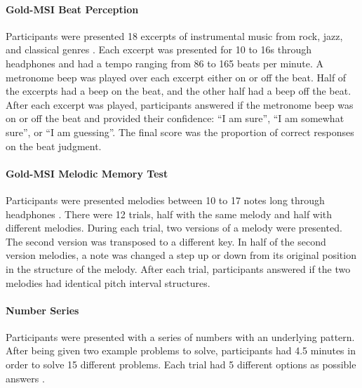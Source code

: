 \documentclass[12pt,]{book}
\let\oldparagraph\paragraph
\renewcommand{\paragraph}[1]{\oldparagraph{#1}\mbox{}}
\begin{document}
\hypertarget{gold-msi-beat-perception}{%
\paragraph{Gold-MSI Beat Perception}\label{gold-msi-beat-perception}}

Participants were presented 18 excerpts of instrumental music from rock, jazz, and classical genres \citep{mullensiefenMusicalityNonMusiciansIndex2014}.
Each excerpt was presented for 10 to 16s through headphones and had a tempo ranging from 86 to 165 beats per
minute.
A metronome beep was played over each excerpt either on or off the beat.
Half of the excerpts had a beep on the beat, and the other half had a beep off the beat.
After each excerpt was played, participants answered if the metronome beep was on or off the beat and provided their confidence: ``I am sure'', ``I am somewhat sure'', or ``I am guessing''.
The final score was the proportion of correct responses on the beat judgment.

\hypertarget{gold-msi-melodic-memory-test}{%
\paragraph{Gold-MSI Melodic Memory Test}\label{gold-msi-melodic-memory-test}}

Participants were presented melodies between 10 to 17 notes long through headphones \citep{mullensiefenMusicalityNonMusiciansIndex2014}.
There were 12 trials, half with the same melody and half with different melodies.
During each trial, two versions of a melody were presented.
The second version was transposed to a different key.
In half of the second version melodies, a note was changed a step up or down from its original position in the structure of the melody.
After each trial, participants answered if the two melodies had identical pitch interval structures.

\hypertarget{number-series}{%
\paragraph{Number Series}\label{number-series}}

Participants were presented with a series of numbers with
an underlying pattern.
After being given two example problems to solve, participants had 4.5 minutes in order to solve 15 different problems.
Each trial had 5 different options as possible answers \citep{thurstonePrimaryMentalAbilities1938}.
\end{document}
